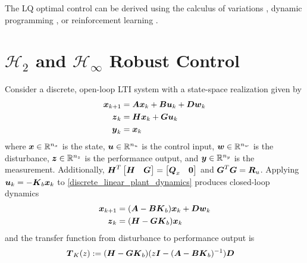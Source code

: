 The LQ optimal control can be derived using the calculus of variations \cite{stengel, kirk}, dynamic programming \cite{bertsekas2012dynamic}, or reinforcement learning \cite{lewis2009reinforcement}.

\section{$\mathcal{H}_{2}$ and $\mathcal{H}_{\infty}$ Robust Control}
Consider a discrete, open-loop LTI system with a state-space realization given by
\begin{subequations}
\begin{align}
	\vb*{x}_{k+1} &= \vb*{A}\vb*{x}_{k} + \vb*{B}\vb*{u}_{k} + \vb*{D}\vb*{w}_{k} \label{discrete_linear_plant_dynamics}\\
	\vb*{z}_{k} &= \vb*{H}\vb*{x}_{k} + \vb*{G}\vb*{u}_{k} \label{discrete_linear_performance}\\
	\vb*{y}_{k} &= \vb*{x}_{k}\label{discrete_linear_plant_measurement}
\end{align} \label{discrete_linear_plant}
\end{subequations}
where $\vb*{x} \in \mathbb{R}^{n_{x}}$ is the state, $\vb*{u} \in \mathbb{R}^{n_{u}}$ is the control input, $\vb*{w} \in \mathbb{R}^{n_{w}}$ is the disturbance, $\vb*{z} \in \mathbb{R}^{n_{z}}$ is the performance output, and $\vb*{y} \in \mathbb{R}^{n_{y}}$ is the measurement.  Additionally, $\vb*{H}^{T} \begin{bmatrix} \vb*{H} & \vb*{G}\end{bmatrix} = \begin{bmatrix} \vb*{Q}_{x} & \vb*{0} \end{bmatrix}$ and $\vb*{G}^{T}\vb*{G} = \vb*{R}_{u}$.  Applying $\vb*{u}_{k} = -\vb*{K}_{b}\vb*{x}_{k}$ to \eqref{discrete_linear_plant_dynamics} produces closed-loop dynamics
\begin{subequations}
\label{discrete_linear_plant_cl}
\begin{align}
	\vb*{x}_{k+1} &= (\vb*{A} - \vb*{B}\vb*{K}_{b})\vb*{x}_{k} + \vb*{D}\vb*{w}_{k} \label{discrete_linear_plant_dynamics_cl}\\
	\vb*{z}_{k} &= (\vb*{H} - \vb*{G}\vb*{K}_{b})\vb*{x}_{k} \label{discrete_linear_performance_cl}
\end{align}
\end{subequations}
and the transfer function from disturbance to performance output is
\begin{equation}
\begin{aligned}
	\vb*{T}_{K}(z) &:= (\vb*{H} - \vb*{G}\vb*{K}_{b})(z\vb*{I} - (\vb*{A} - \vb*{B}\vb*{K}_{b})^{-1})\vb*{D}
\end{aligned} \label{discrete_transfer_matrix}
\end{equation}

